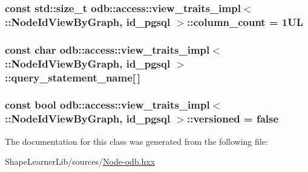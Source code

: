 \subsubsection[{column\+\_\+count}]{\setlength{\rightskip}{0pt plus 5cm}const std\+::size\+\_\+t odb\+::access\+::view\+\_\+traits\+\_\+impl$<$ \+::{\bf Node\+Id\+View\+By\+Graph}, id\+\_\+pgsql $>$\+::column\+\_\+count = 1\+U\+L\hspace{0.3cm}{\ttfamily [static]}}\label{classodb_1_1access_1_1view__traits__impl_3_01_1_1_node_id_view_by_graph_00_01id__pgsql_01_4_a7e1530aece76aec8b796ac2c9be7645a}
\hypertarget{classodb_1_1access_1_1view__traits__impl_3_01_1_1_node_id_view_by_graph_00_01id__pgsql_01_4_aac817e96b328c64879030ff16444a238}{}
\subsubsection[{query\+\_\+statement\+\_\+name}]{\setlength{\rightskip}{0pt plus 5cm}const char odb\+::access\+::view\+\_\+traits\+\_\+impl$<$ \+::{\bf Node\+Id\+View\+By\+Graph}, id\+\_\+pgsql $>$\+::query\+\_\+statement\+\_\+name\mbox{[}$\,$\mbox{]}\hspace{0.3cm}{\ttfamily [static]}}\label{classodb_1_1access_1_1view__traits__impl_3_01_1_1_node_id_view_by_graph_00_01id__pgsql_01_4_aac817e96b328c64879030ff16444a238}
\hypertarget{classodb_1_1access_1_1view__traits__impl_3_01_1_1_node_id_view_by_graph_00_01id__pgsql_01_4_a80d38be4caf64e5bf706dcd1fee086a0}{}
\subsubsection[{versioned}]{\setlength{\rightskip}{0pt plus 5cm}const bool odb\+::access\+::view\+\_\+traits\+\_\+impl$<$ \+::{\bf Node\+Id\+View\+By\+Graph}, id\+\_\+pgsql $>$\+::versioned = false\hspace{0.3cm}{\ttfamily [static]}}\label{classodb_1_1access_1_1view__traits__impl_3_01_1_1_node_id_view_by_graph_00_01id__pgsql_01_4_a80d38be4caf64e5bf706dcd1fee086a0}


The documentation for this class was generated from the following file\+:\begin{DoxyCompactItemize}
\item 
Shape\+Learner\+Lib/sources/\hyperlink{_node-odb_8hxx}{Node-\/odb.\+hxx}\end{DoxyCompactItemize}
